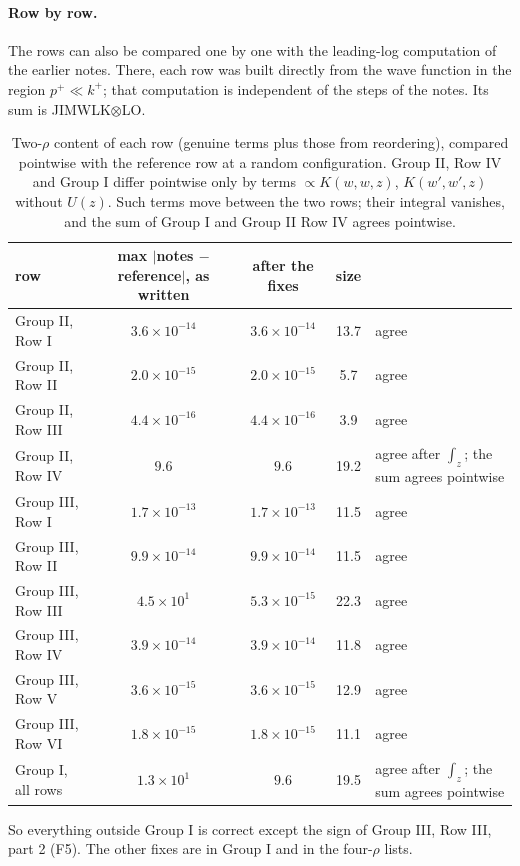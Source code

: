 \documentclass[10pt]{article}
\numberwithin{equation}{section}
\begin{document}
\paragraph{Row by row.} The rows can also be compared one by one with the leading-log computation of the earlier notes. There, each row was built directly from the wave function in the region $p^+\ll k^+$; that computation is independent of the steps of the notes. Its sum is JIMWLK$\otimes$LO.
\begin{table}[h]
\centering\small
\begin{tabular}{@{}l c c c l@{}}
row & max $|$notes $-$ reference$|$, as written & after the fixes & size & \\ \hline
Group II, Row I & $3.6\times10^{-14}$ & $3.6\times10^{-14}$ & 13.7 & agree\\
Group II, Row II & $2.0\times10^{-15}$ & $2.0\times10^{-15}$ & 5.7 & agree\\
Group II, Row III & $4.4\times10^{-16}$ & $4.4\times10^{-16}$ & 3.9 & agree\\
Group II, Row IV & $9.6$ & $9.6$ & 19.2 & agree after $\int_z$; the sum agrees pointwise\\
Group III, Row I & $1.7\times10^{-13}$ & $1.7\times10^{-13}$ & 11.5 & agree\\
Group III, Row II & $9.9\times10^{-14}$ & $9.9\times10^{-14}$ & 11.5 & agree\\
Group III, Row III & $4.5\times10^{1}$ & $5.3\times10^{-15}$ & 22.3 & agree\\
Group III, Row IV & $3.9\times10^{-14}$ & $3.9\times10^{-14}$ & 11.8 & agree\\
Group III, Row V & $3.6\times10^{-15}$ & $3.6\times10^{-15}$ & 12.9 & agree\\
Group III, Row VI & $1.8\times10^{-15}$ & $1.8\times10^{-15}$ & 11.1 & agree\\
Group I, all rows & $1.3\times10^{1}$ & $9.6$ & 19.5 & agree after $\int_z$; the sum agrees pointwise\\
\end{tabular}
\caption{Two-$\rho$ content of each row (genuine terms plus those from reordering), compared pointwise with the reference row at a random configuration. Group II, Row IV and Group I differ pointwise only by terms $\propto K(w,w,z)$, $K(w',w',z)$ without $U(z)$. Such terms move between the two rows; their integral vanishes, and the sum of Group I and Group II Row IV agrees pointwise.}
\label{tab:rows}
\end{table}
So everything outside Group I is correct except the sign of Group III, Row III, part 2 (F5). The other fixes are in Group I and in the four-$\rho$ lists.
\end{document}
